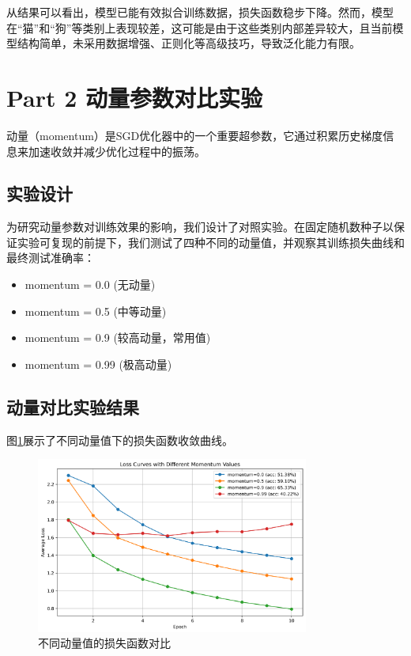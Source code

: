 \documentclass[12pt,a4paper,UTF8]{ctexart}
\begin{document}
从结果可以看出，模型已能有效拟合训练数据，损失函数稳步下降。然而，模型在“猫”和“狗”等类别上表现较差，这可能是由于这些类别内部差异较大，且当前模型结构简单，未采用数据增强、正则化等高级技巧，导致泛化能力有限。

\section{\textbf{Part 2} 动量参数对比实验}

动量（momentum）是SGD优化器中的一个重要超参数，它通过积累历史梯度信息来加速收敛并减少优化过程中的振荡。

\subsection{实验设计}
为研究动量参数对训练效果的影响，我们设计了对照实验。在固定随机数种子以保证实验可复现的前提下，我们测试了四种不同的动量值，并观察其训练损失曲线和最终测试准确率：
\begin{itemize}
    \item momentum = 0.0 (无动量)
    \item momentum = 0.5 (中等动量)
    \item momentum = 0.9 (较高动量，常用值)
    \item momentum = 0.99 (极高动量)
\end{itemize}

\subsection{动量对比实验结果}
图\ref{fig:momentum_comparison}展示了不同动量值下的损失函数收敛曲线。

\begin{figure}[H]
    \centering
    \includegraphics[width=0.8\textwidth]{momentum_comparison.png}
    \caption{不同动量值的损失函数对比}
    \label{fig:momentum_comparison}
\end{figure}
\end{document}
